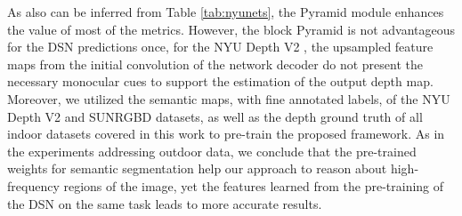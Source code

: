 \documentclass[5p]{elsarticle}
\begin{document}
As also can be inferred from Table \ref{tab:nyunets}, the Pyramid module enhances the value of most of the metrics. However, the block Pyramid is not advantageous for the DSN  predictions once, for the NYU Depth V2 \cite{silberman2012indoor}, the upsampled feature maps from the initial convolution of the network decoder do not present the necessary monocular cues to support the estimation of the output depth map. Moreover, we utilized the semantic maps, with  fine annotated labels, of the NYU Depth V2 \cite{silberman2012indoor} and SUNRGBD \cite{song2015sun} datasets, as well as the depth ground truth of all indoor datasets covered in this work to pre-train the proposed framework. As in the experiments addressing outdoor data, we conclude that the pre-trained weights for semantic segmentation help our approach to reason about high-frequency regions of the image, yet the features learned from the pre-training of the DSN  on the same task leads to more accurate results.
\end{document}
